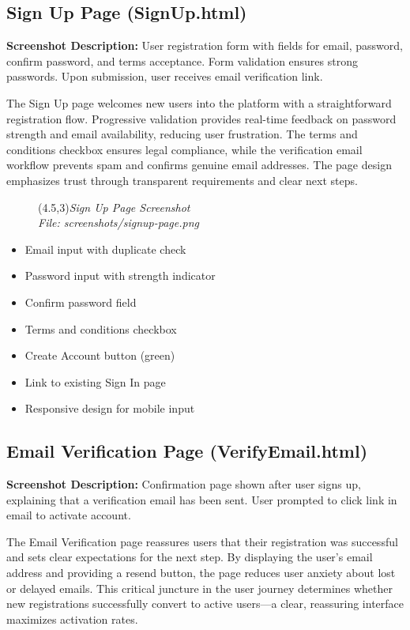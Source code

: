 \documentclass[a4paper,12pt]{article}
\begin{document}
\subsection{Sign Up Page (SignUp.html)}
\textbf{Screenshot Description:} User registration form with fields for email, password, confirm password, and terms acceptance. Form validation ensures strong passwords. Upon submission, user receives email verification link.

The Sign Up page welcomes new users into the platform with a straightforward registration flow. Progressive validation provides real-time feedback on password strength and email availability, reducing user frustration. The terms and conditions checkbox ensures legal compliance, while the verification email workflow prevents spam and confirms genuine email addresses. The page design emphasizes trust through transparent requirements and clear next steps.

\begin{figure}[h]
    \centering
    \framebox(4.5,3){\textit{Sign Up Page Screenshot}}\\
    \small\textit{File: screenshots/signup-page.png}
\end{figure}

\begin{itemize}
    \item Email input with duplicate check
    \item Password input with strength indicator
    \item Confirm password field
    \item Terms and conditions checkbox
    \item Create Account button (green)
    \item Link to existing Sign In page
    \item Responsive design for mobile input
\end{itemize}

\subsection{Email Verification Page (VerifyEmail.html)}
\textbf{Screenshot Description:} Confirmation page shown after user signs up, explaining that a verification email has been sent. User prompted to click link in email to activate account.

The Email Verification page reassures users that their registration was successful and sets clear expectations for the next step. By displaying the user's email address and providing a resend button, the page reduces user anxiety about lost or delayed emails. This critical juncture in the user journey determines whether new registrations successfully convert to active users—a clear, reassuring interface maximizes activation rates.
\end{document}
